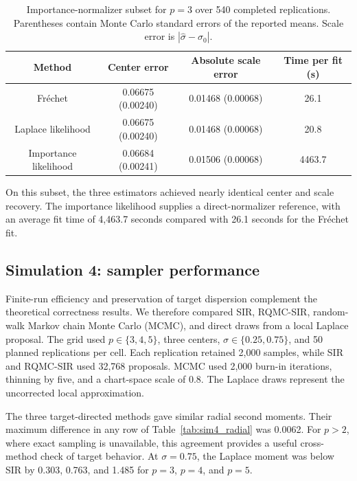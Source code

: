 \documentclass[
  12pt]{article}
\begin{document}
\begin{table}[ht]
\centering
\caption{Importance-normalizer subset for $p=3$ over 540 completed replications. Parentheses contain Monte Carlo standard errors of the reported means. Scale error is $|\widehat\sigma-\sigma_0|$.}
\label{tab:sim3_importance}
\begin{tabular}{cccc}
\toprule
Method & Center error & Absolute scale error & Time per fit (s) \\
\midrule
Fr\'echet & 0.06675 (0.00240) & 0.01468 (0.00068) & 26.1 \\
Laplace likelihood & 0.06675 (0.00240) & 0.01468 (0.00068) & 20.8 \\
Importance likelihood & 0.06684 (0.00241) & 0.01506 (0.00068) & 4463.7 \\
\bottomrule
\end{tabular}
\end{table}

On this subset, the three estimators achieved nearly identical center and scale recovery. The importance likelihood supplies a direct-normalizer reference, with an average fit time of 4,463.7 seconds compared with 26.1 seconds for the Fr\'echet fit.


\subsection{Simulation 4: sampler performance}\label{sec:sim4}

Finite-run efficiency and preservation of target dispersion complement the theoretical correctness results. We therefore compared SIR, RQMC-SIR, random-walk Markov chain Monte Carlo (MCMC), and direct draws from a local Laplace proposal. The grid used $p\in\{3,4,5\}$, three centers, $\sigma\in\{0.25,0.75\}$, and 50 planned replications per cell. Each replication retained 2,000 samples, while SIR and RQMC-SIR used 32,768 proposals. MCMC used 2,000 burn-in iterations, thinning by five, and a chart-space scale of 0.8. The Laplace draws represent the uncorrected local approximation.

The three target-directed methods gave similar radial second moments. Their maximum difference in any row of Table~\ref{tab:sim4_radial} was 0.0062. For $p>2$, where exact sampling is unavailable, this agreement provides a useful cross-method check of target behavior. At $\sigma=0.75$, the Laplace moment was below SIR by 0.303, 0.763, and 1.485 for $p=3$, $p=4$, and $p=5$.
\end{document}
